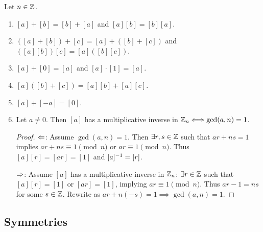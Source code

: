 \documentclass[]{article}
\begin{document}
\begin{proposition}
	Let $n\in\mathbb{Z}$.
	\begin{enumerate}
		\item $[a]+[b] = [b] + [a]$ and $[a][b] = [b][a]$.
		\item $([a]+[b])+[c] = [a] + ([b]+[c])$ and $([a][b])[c] = [a]([b][c])$.
		\item $[a]+[0] = [a]$ and $[a]\cdot [1] =[a]$.
		\item $[a]([b]+[c]) = [a][b] + [a][c]$.
		\item $[a]+[-a] = [0]$.
		\item Let $a\neq 0$. Then $[a]$ has a multiplicative inverse in $\mathbb{Z}_n \Longleftrightarrow \gcd(a,n) = 1$.
		\begin{proof}
			\ul{$\Leftarrow$}: Assume $\gcd(a,n) = 1$. Then $\exists r,s\in\mathbb{Z}$ such that $ar+ns = 1$ implies $ar+ns \equiv 1\pmod n$ or $ar\equiv 1\pmod n$. Thus $[a][r] = [ar] = [1]$ and $[a]^{-1} = [r]$.

			\ul{$\Rightarrow$}: Assume $[a]$ has a multiplicative inverse in $\mathbb{Z}_n$: $\exists r\in\mathbb{Z}$ such that $[a][r] = [1]$ or $[ar] = [1]$, implying $ar\equiv 1\pmod n$. Thus $ar-1 = ns$ for some $s\in\mathbb{Z}$. Rewrite as $ar+n(-s) = 1 \implies \gcd(a,n) = 1$.
		\end{proof}
	\end{enumerate}
\end{proposition}

\subsection{Symmetries}
\end{document}
